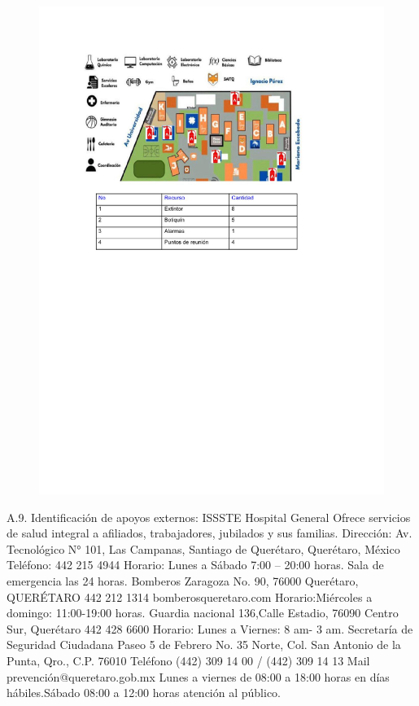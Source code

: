     \begin{figure}[H]
        \centering
        \includegraphics[trim = {0mm 0mm 0mm 0mm},clip,scale=0.3]{20/img/Identificacion de capacidades.pdf}
        \end{figure}
     A.9.  Identificación de apoyos externos:
     ISSSTE Hospital General
    Ofrece servicios de salud integral a afiliados, trabajadores, jubilados y sus familias.
    Dirección: Av. Tecnológico N° 101, Las Campanas, Santiago de Querétaro, Querétaro, México
    Teléfono: 442 215 4944
    Horario:
    Lunes a Sábado 7:00 – 20:00 horas.
    Sala de emergencia las 24 horas.
    Bomberos
    Zaragoza No. 90, 76000 Querétaro, QUERÉTARO
    442 212 1314
    bomberosqueretaro.com
    Horario:Miércoles a domingo: 11:00-19:00 horas.
    Guardia nacional
    136,Calle Estadio, 76090 Centro Sur, Querétaro
    442 428 6600
    Horario: Lunes a Viernes: 8 am- 3 am.
    Secretaría de Seguridad Ciudadana
    Paseo 5 de Febrero No. 35 Norte, Col. San Antonio de la Punta, Qro., C.P. 76010
    Teléfono
    (442) 309 14 00 / (442) 309 14 13
    Mail
    prevención@queretaro.gob.mx
    Lunes a viernes de 08:00 a 18:00 horas en días hábiles.Sábado 08:00 a 12:00 horas atención al
    público.
    
